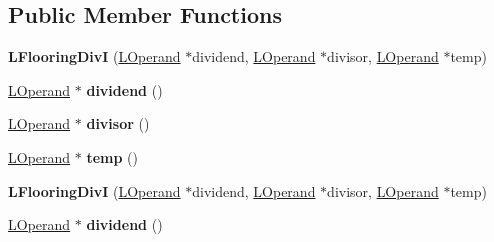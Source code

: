 \subsection*{Public Member Functions}
\begin{DoxyCompactItemize}
\item 
{\bfseries L\+Flooring\+DivI} (\hyperlink{classv8_1_1internal_1_1_l_operand}{L\+Operand} $\ast$dividend, \hyperlink{classv8_1_1internal_1_1_l_operand}{L\+Operand} $\ast$divisor, \hyperlink{classv8_1_1internal_1_1_l_operand}{L\+Operand} $\ast$temp)\hypertarget{classv8_1_1internal_1_1_l_flooring_div_i_ac86b4e7af079084e1bf5758a9c9ecef1}{}\label{classv8_1_1internal_1_1_l_flooring_div_i_ac86b4e7af079084e1bf5758a9c9ecef1}

\item 
\hyperlink{classv8_1_1internal_1_1_l_operand}{L\+Operand} $\ast$ {\bfseries dividend} ()\hypertarget{classv8_1_1internal_1_1_l_flooring_div_i_aa8325f9821019c14c21d3db92a6e27bb}{}\label{classv8_1_1internal_1_1_l_flooring_div_i_aa8325f9821019c14c21d3db92a6e27bb}

\item 
\hyperlink{classv8_1_1internal_1_1_l_operand}{L\+Operand} $\ast$ {\bfseries divisor} ()\hypertarget{classv8_1_1internal_1_1_l_flooring_div_i_a08339949c5e8e7eeaaa718262a80085f}{}\label{classv8_1_1internal_1_1_l_flooring_div_i_a08339949c5e8e7eeaaa718262a80085f}

\item 
\hyperlink{classv8_1_1internal_1_1_l_operand}{L\+Operand} $\ast$ {\bfseries temp} ()\hypertarget{classv8_1_1internal_1_1_l_flooring_div_i_a2bf7b47423b702a7916cf167bcbd322d}{}\label{classv8_1_1internal_1_1_l_flooring_div_i_a2bf7b47423b702a7916cf167bcbd322d}

\item 
{\bfseries L\+Flooring\+DivI} (\hyperlink{classv8_1_1internal_1_1_l_operand}{L\+Operand} $\ast$dividend, \hyperlink{classv8_1_1internal_1_1_l_operand}{L\+Operand} $\ast$divisor, \hyperlink{classv8_1_1internal_1_1_l_operand}{L\+Operand} $\ast$temp)\hypertarget{classv8_1_1internal_1_1_l_flooring_div_i_ac86b4e7af079084e1bf5758a9c9ecef1}{}\label{classv8_1_1internal_1_1_l_flooring_div_i_ac86b4e7af079084e1bf5758a9c9ecef1}

\item 
\hyperlink{classv8_1_1internal_1_1_l_operand}{L\+Operand} $\ast$ {\bfseries dividend} ()\hypertarget{classv8_1_1internal_1_1_l_flooring_div_i_aa8325f9821019c14c21d3db92a6e27bb}{}\label{classv8_1_1internal_1_1_l_flooring_div_i_aa8325f9821019c14c21d3db92a6e27bb}


\end{DoxyCompactItemize}
